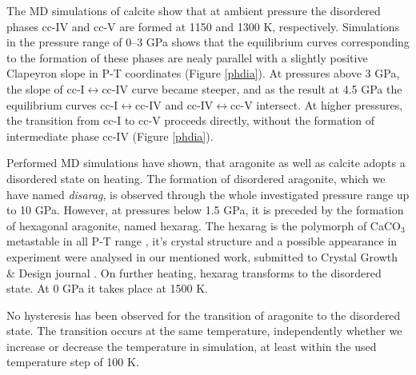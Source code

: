 \documentclass[journal=jacsat,manuscript=article]{achemso}
\begin{document}
The MD simulations of calcite show that at ambient pressure the disordered phases cc-IV and cc-V are formed at 1150 and 1300 K, respectively. 
Simulations in the pressure range of 0--3 GPa shows that the equilibrium curves corresponding to the formation of these phases are nealy parallel with a slightly positive Clapeyron slope in P-T coordinates (Figure \ref{phdia}). 
At pressures above 3 GPa, the slope of cc-I$\leftrightarrow$cc-IV curve became steeper, and as the result at 4.5 GPa the equilibrium curves cc-I$\leftrightarrow$cc-IV and cc-IV$\leftrightarrow$cc-V intersect.
At higher pressures, the transition from cc-I to cc-V proceeds directly, without the formation of intermediate phase cc-IV (Figure \ref{phdia}). 

Performed MD simulations have shown, that aragonite as well as calcite adopts a disordered state on heating. 
The formation of disordered aragonite, which we have named {\it disarag}, is observed through the whole investigated pressure range up to 10 GPa. 
However, at pressures below 1.5 GPa, it is preceded by the formation of hexagonal aragonite, named hexarag. 
The hexarag is the polymorph of CaCO$_3$ metastable in all P-T range \cite{kawano2009}, it's crystal structure and a possible appearance in experiment were analysed in our mentioned work, submitted to Crystal Growth \& Design journal  \cite{gavr2020_hexar}. 
On further heating, hexarag transforms to the disordered state.
At 0 GPa it takes place at 1500 K.

No hysteresis has been observed for the transition of aragonite to the disordered state. 
The transition occurs at the same temperature, independently whether we increase or decrease the temperature in simulation, at least within the used temperature step of 100 K.
\end{document}

